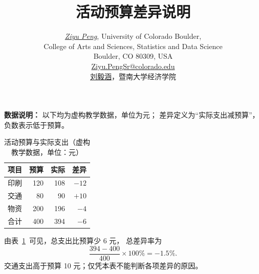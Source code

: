 \documentclass[UTF8,a4paper,fontset=fandol]{ctexart}
\title{活动预算差异说明}
\author{\href{https://github.com/pzy54154631-hub}{\textit{Ziyu Peng}}, University of Colorado Boulder,
  \\[0.1em]College of Arts and Sciences, Statistics and Data Science
  \\[0.1em]Boulder, CO 80309, USA
  \\[0.1em]\href{mailto:Ziyu.PengSr@colorado.edu}{Ziyu.PengSr@colorado.edu}
  \\[0.35em]
  \href{https://pzy54154631-hub.github.io/liuyihan/}{刘毅涵}，暨南大学经济学院}
\date{}
\begin{document}
\maketitle

\noindent\textbf{数据说明：}
以下均为虚构教学数据，单位为元；
差异定义为“实际支出减预算”，负数表示低于预算。

\begin{table}[htbp]
\centering
\caption{活动预算与实际支出（虚构教学数据，单位：元）}
\label{tab:budget}
\begin{tabular}{@{}lrrr@{}}
\toprule
项目 & 预算 & 实际 & 差异 \\
\midrule
印刷 & 120 & 108 & \(-12\) \\
交通 & 80  & 90  & \(+10\) \\
物资 & 200 & 196 & \(-4\) \\
\midrule
合计 & 400 & 394 & \(-6\) \\
\bottomrule
\end{tabular}
\end{table}

由表~\ref{tab:budget}~可见，总支出比预算少 6 元，
总差异率为
\[
  \frac{394-400}{400}\times100\%=-1.5\%.
\]
交通支出高于预算 10 元；仅凭本表不能判断各项差异的原因。
\end{document}
